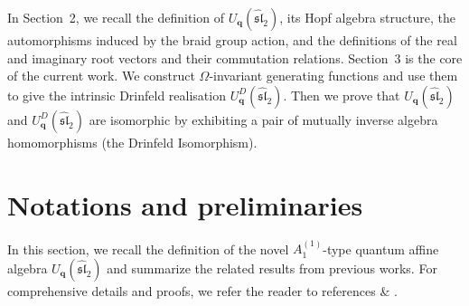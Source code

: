\documentclass[12pt]{amsart}
\numberwithin{equation}{section}
\numberwithin{equation}{section}
\begin{document}
In Section~2, we recall the definition of \(U_{\mathbf q}(\widehat{\mathfrak{sl}}_2)\), its Hopf algebra structure, the automorphisms induced by the braid group action, and the definitions of the real and imaginary root vectors and their commutation relations.  
Section~3 is the core of the current work. We construct \(\Omega\)-invariant generating functions and use them to give the intrinsic Drinfeld realisation \(U_{\mathbf q}^{D}(\widehat{\mathfrak{sl}}_2)\). Then we prove that \(U_{\mathbf q}(\widehat{\mathfrak{sl}}_2)\) and \(U_{\mathbf q}^{D}(\widehat{\mathfrak{sl}}_2)\) are isomorphic by exhibiting a pair of mutually inverse algebra homomorphisms (the Drinfeld Isomorphism).


\section{Notations and preliminaries}
In this section, we recall the definition of the novel 
$A^{(1)}_1$-type quantum affine algebra 
\(U_{\textbf{q}}(\widehat{\mathfrak{sl}}_2)\)
and summarize the related results from previous works. For comprehensive details and proofs, we refer the reader to references \cite{FHZ} \& \cite{HZhuang}.
\end{document}
